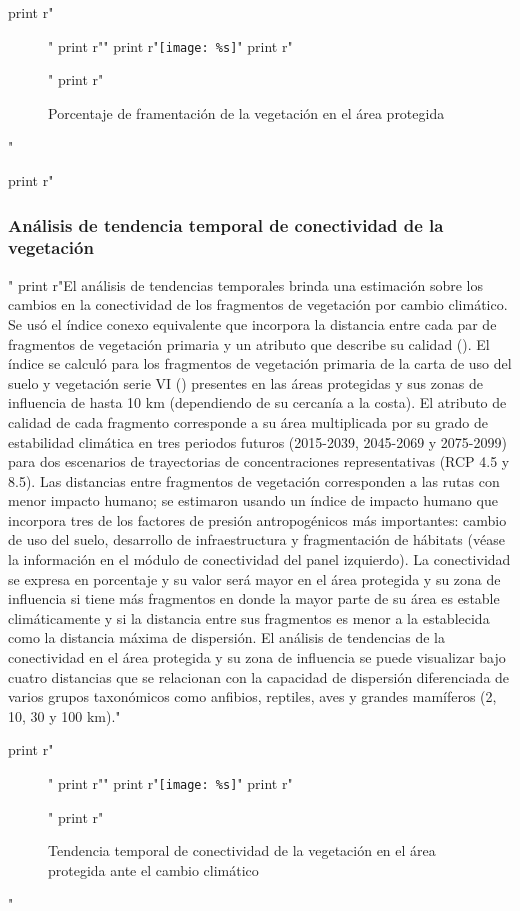 \documentclass{article}
\begin{document}
\begin{python}
{{		   print r"\begin{figure}[H]"
		   print r"\centering"
		   print r"\texttt{[image: \%s]}" %
		   print r"\caption{Porcentaje de framentaci\'on de la vegetaci\'on en el \'area protegida}"
		   print r"\end{figure}"

		   print r"\subsubsection{An\'alisis de tendencia temporal de conectividad de la vegetaci\'on}"
		   print r"El an\'alisis de tendencias temporales brinda una estimaci\'on sobre los cambios en la conectividad de los fragmentos de vegetaci\'on por cambio clim\'atico. Se us\'o el \'indice conexo equivalente que incorpora la distancia entre cada par de fragmentos de vegetaci\'on primaria y un atributo que describe su calidad (\cite{Saura11, Saura17}). El \'indice se calcul\'o para los fragmentos de vegetaci\'on primaria de la carta de uso del suelo y vegetaci\'on serie VI (\cite{Inegi2013, Inegi2016}) presentes en las \'areas protegidas y sus zonas de influencia de hasta 10 km (dependiendo de su cercanía a la costa). El atributo de calidad de cada fragmento corresponde a su \'area multiplicada por su grado de estabilidad clim\'atica en tres periodos futuros (2015-2039, 2045-2069 y 2075-2099) para dos escenarios de trayectorias de concentraciones representativas (RCP 4.5 y 8.5). Las distancias entre fragmentos de vegetaci\'on corresponden a las rutas con menor impacto humano; se estimaron usando un \'indice de impacto humano que incorpora tres de los factores de presi\'on antropog\'enicos m\'as importantes: cambio de uso del suelo, desarrollo de infraestructura y fragmentaci\'on de h\'abitats (v\'ease la informaci\'on en el m\'odulo de conectividad del panel izquierdo). La conectividad se expresa en porcentaje y su valor ser\'a mayor en el \'area protegida y su zona de influencia si tiene m\'as fragmentos en donde la mayor parte de su \'area es estable clim\'aticamente y si la distancia entre sus fragmentos es menor a la establecida como la distancia m\'axima de dispersi\'on. El an\'alisis de tendencias de la conectividad en el \'area protegida y su zona de influencia se puede visualizar bajo cuatro distancias que se relacionan con la capacidad de dispersi\'on diferenciada de varios grupos taxon\'omicos como anfibios, reptiles, aves y grandes mam\'iferos (2, 10, 30 y 100 km)."

		   print r"\begin{figure}[H]"
		   print r"\centering"
		   print r"\texttt{[image: \%s]}" %
		   print r"\caption{Tendencia temporal de conectividad de la vegetaci\'on en el \'area protegida ante el cambio clim\'atico}"
		   print r"\end{figure}"

}}
\end{python}
\end{document}
